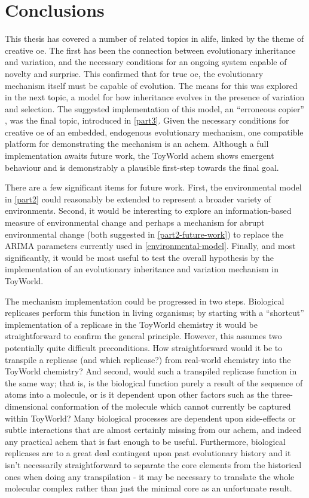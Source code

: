 \chapter{Conclusions}\label{thesis-conclusions}

This thesis has covered a number of related topics in \gls{alife}, linked by the theme of creative \gls{oe}. The first has been the connection between evolutionary inheritance and variation, and the necessary conditions for an ongoing system capable of novelty and surprise. This confirmed that for true \gls{oe}, the evolutionary mechanism itself must be capable of evolution. The means for this was explored in the next topic, a model for how inheritance evolves in the presence of variation and selection. The suggested implementation of this model, an ``erroneous copier'' \parencite[p.16]{Zachar2010}, was the final topic, introduced in \cref{part3}. Given the necessary conditions for creative \gls{oe} of an embedded, endogenous evolutionary mechanism, one compatible platform for demonstrating the mechanism is an \gls{achem}. Although a full implementation awaits future work, the ToyWorld \gls{achem} shows emergent behaviour and is demonstrably a plausible first-step towards the final goal.

There are a few significant items for future work. First, the environmental model in \cref{part2} could reasonably be extended to represent a broader variety of environments. Second, it would be interesting to explore an information-based measure of environmental change and perhaps a mechanism for abrupt environmental change (both suggested in \cref{part2-future-work}) to replace the ARIMA parameters currently used in \cref{environmental-model}. Finally, and most significantly, it would be most useful to test the overall hypothesis by the implementation of an evolutionary inheritance and variation mechanism in ToyWorld.

The mechanism implementation could be progressed in two steps. Biological replicases perform this function in living organisms; by starting with a ``shortcut'' implementation of a replicase in the ToyWorld chemistry it would be straightforward to confirm the general principle. However, this assumes two potentially quite difficult preconditions. How straightforward would it be to transpile a replicase (and which replicase?) from real-world chemistry into the ToyWorld chemistry? And second, would such a transpiled replicase function in the same way; that is, is the biological function purely a result of the sequence of atoms into a molecule, or is it dependent upon other factors such as the three-dimensional conformation of the molecule which cannot currently be captured within ToyWorld? Many biological processes are dependent upon side-effects or subtle interactions that are almost certainly missing from our \gls{achem}, and indeed any practical \gls{achem} that is fast enough to be useful. Furthermore, biological replicases are to a great deal contingent upon past evolutionary history and it isn't necessarily straightforward to separate the core elements from the historical ones when doing any transpilation - it may be necessary to translate the whole molecular complex rather than just the minimal core as an unfortunate result.

